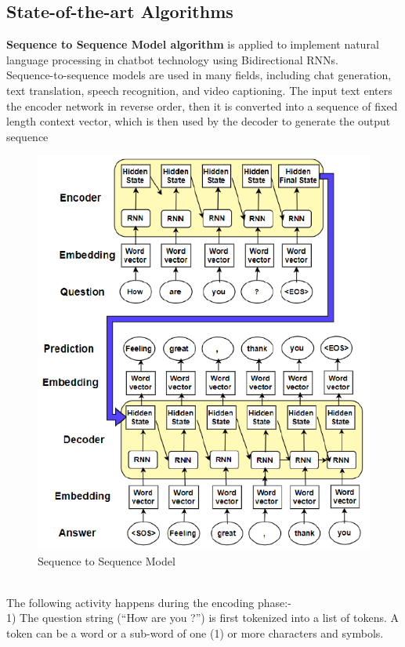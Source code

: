 \documentclass[12pt,a4paper]{report}     %
\begin{document}
\begin{normalsize}
{\section{State-of-the-art Algorithms}
{\setlength{\baselineskip}{1.1\baselineskip}
{\bf Sequence to Sequence Model algorithm} is applied to implement natural language processing in chatbot technology using Bidirectional RNNs. \\
\-\hspace{1cm}Sequence-to-sequence models are used in many fields,
including chat generation, text translation, speech recognition,
and video captioning. The input text enters the encoder network in reverse
order, then it is converted into a sequence of fixed length context vector, which is then used by the decoder to generate the output sequence 
\begin{figure}[h!]
    \centering
    \includegraphics[width=12cm]{seq2seq2.png}
    \caption{Sequence to Sequence Model}
    \label{fig:seq2seq}
\end{figure}
}
\-\hspace{1cm}\\ The following activity happens during the encoding phase:- \\
1) The question string (``How are you ?'') is first tokenized into a list of tokens. A token can be a word or a sub-word of one (1) or more characters and symbols.\\
}
\end{normalsize}
\end{document}
